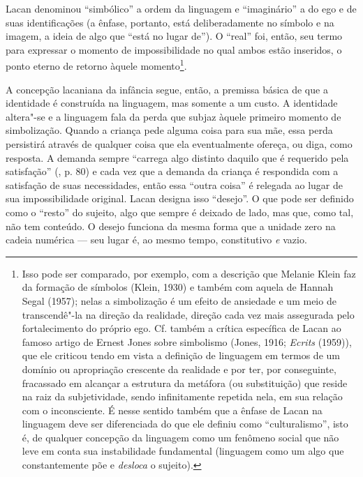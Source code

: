 Lacan denominou ``simbólico'' a ordem da linguagem e ``imaginário'' a do
ego e de suas identificações (a ênfase, portanto, está deliberadamente
no símbolo e na imagem, a ideia de algo que ``está no lugar de''). O
``real'' foi, então, seu termo para expressar o momento de
impossibilidade no qual ambos estão inseridos, o ponto eterno de retorno
àquele momento\footnote{Isso pode ser comparado, por exemplo, com a
  descrição que Melanie Klein faz da formação de símbolos (Klein, 1930)
  e também com aquela de Hannah Segal (1957); nelas a simbolização é um
  efeito de ansiedade e um meio de transcendê"-la na direção da
  realidade, direção cada vez mais assegurada pelo fortalecimento do
  próprio ego. Cf. também a crítica específica de Lacan ao famoso artigo
  de Ernest Jones sobre simbolismo (Jones, 1916; \emph{Ecrits} (1959)),
  que ele criticou tendo em vista a definição de linguagem em termos de
  um domínio ou apropriação crescente da realidade e por ter, por
  conseguinte, fracassado em alcançar a estrutura da metáfora (ou
  substituição) que reside na raiz da subjetividade, sendo infinitamente
  repetida nela, em sua relação com o inconsciente. É nesse sentido
  também que a ênfase de Lacan na linguagem deve ser diferenciada do que
  ele definiu como ``culturalismo'', isto é, de qualquer concepção da
  linguagem como um fenômeno social que não leve em conta sua
  instabilidade fundamental (linguagem como um algo que constantemente
  põe e \emph{desloca} o sujeito).}.

A concepção lacaniana da infância segue, então, a premissa básica de que
a identidade é construída na linguagem, mas somente a um custo. A
identidade altera"-se e a linguagem fala da perda que subjaz àquele
primeiro momento de simbolização. Quando a criança pede alguma coisa
para sua mãe, essa perda persistirá através de qualquer coisa que ela
eventualmente ofereça, ou diga, como resposta. A demanda sempre
``carrega algo distinto daquilo que é requerido pela satisfação'' (,
p. 80) e cada vez que a demanda da criança é respondida com a satisfação
de suas necessidades, então essa ``outra coisa'' é relegada ao lugar de
sua impossibilidade original. Lacan designa isso ``desejo''. O que pode
ser definido como o ``resto'' do sujeito, algo que sempre é deixado de
lado, mas que, como tal, não tem conteúdo. O desejo funciona da mesma
forma que a unidade zero na cadeia numérica --- seu lugar é, ao mesmo
tempo, constitutivo \emph{e} vazio.

